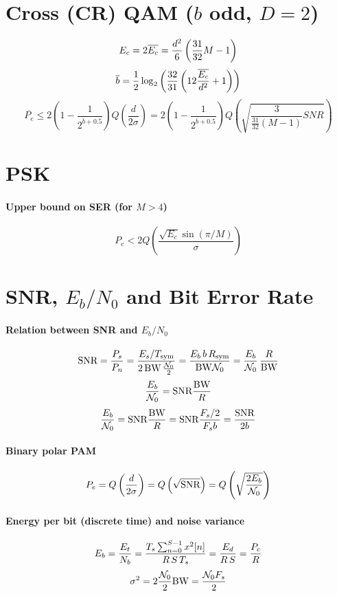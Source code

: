 \section*{Cross (CR) QAM ($b$ odd, $D=2$)}
$${E_c} = 2\overline{{E_c}} = \frac{d^2}{6} \left( \frac {31} {32} M -1 \right)$$
$$\overline{b} = \frac 1 2 \log_2 \left(\frac {32} {31} \left(12 \frac{\overline{{E_c}}}{d^2}+1 \right) \right)$$
$$\overline{P_e} \le 2 \left(1 - \frac 1 { 2^{\overline{b}+0.5} } \right)	Q \left( \frac{d}{2 \sigma} \right)
	 = 2 \left(1 - \frac 1 {2^{\overline{b}+0.5}}\right) Q \left( \sqrt{\frac{3}{\frac {31} {32} (M-1)}SNR} \right)$$

\section*{PSK}

\paragraph{Upper bound on SER (for $M>4$)}
\[
P_e < 2 Q\left( \frac{\sqrt{E_c} \sin(\pi/M)}{\sigma}  \right)
\]

\section*{SNR, $E_b/N_0$ and Bit Error Rate}

\paragraph{Relation between SNR and $E_b/N_0$}
\[
{\textrm{SNR}} = \frac{P_s}{P_n} = \frac{E_s/{T_{\textrm{sym}}}}{2 \, {\textrm{BW}} \, \frac {{\cal N}_0} 2} = \frac{E_b \, b \, {R_{\textrm{sym}}}}{{\textrm{BW}} {\cal N}_0} = \frac{E_b}{{\cal N}_0} \, \frac{R}{{\textrm{BW}}}
\]
\begin{equation}
\frac{E_b}{{\cal N}_0} = {\textrm{SNR}} \frac{{\textrm{BW}}}{R}
\label{eq:ebn0}
\end{equation}
\begin{equation}
\frac{E_b}{{\cal N}_0} = {\textrm{SNR}} \frac{{\textrm{BW}}}{R} = {\textrm{SNR}} \frac{{F_s}/2}{{F_s} b} = \frac{{\textrm{SNR}}}{2 b}
\label{eq:ebn0_snr}
\end{equation}

\paragraph{Binary polar PAM}
\[
P_e = Q \left( \frac{d}{2 \sigma} \right) = Q \left( \sqrt{ {\textrm{SNR}} } \right) = Q \left( \sqrt{\frac{2 E_b}{{\cal N}_0}} \right)
\]

\paragraph{Energy per bit (discrete time) and noise variance}
\[
E_b = \frac{E_t}{N_b} = \frac{{T_s} \sum_{n=0}^{S-1}{x^2[n]}}{R \, S \, {T_s}} = \frac{E_d}{R \, S} = \frac{P_c}{R}
\]
\[
\sigma^2 = 2 \frac{{\cal N}_0}{2} {\textrm{BW}} = \frac{{\cal N}_0 {F_s}}{2}
\]

